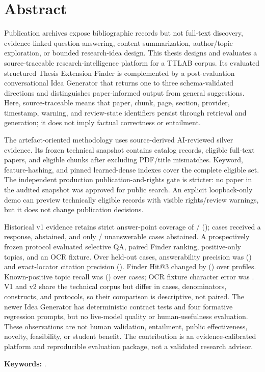 \chapter*{Abstract}

Publication archives expose bibliographic records but not full-text discovery, evidence-linked question answering, content summarization, author/topic exploration, or bounded research-idea design. This thesis designs and evaluates a source-traceable research-intelligence platform for a TTLAB corpus. Its evaluated structured Thesis Extension Finder is complemented by a post-evaluation conversational Idea Generator that returns one to three schema-validated directions and distinguishes paper-informed output from general suggestions. Here, source-traceable means that paper, chunk, page, section, provider, timestamp, warning, and review-state identifiers persist through retrieval and generation; it does not imply factual correctness or entailment.

The artefact-oriented methodology uses source-derived AI-reviewed silver evidence. Its frozen technical snapshot contains \CatalogPaperCount{} catalog records, \EligiblePaperCount{} eligible full-text papers, and \EligibleChunkCount{} eligible chunks after excluding \MismatchPaperCount{} PDF/title mismatches. Keyword, feature-hashing, and pinned learned-dense indexes cover the complete eligible set. The independent production publication-and-rights gate is stricter: no paper in the audited snapshot was approved for public search. An explicit loopback-only demo can preview technically eligible records with visible rights/review warnings, but it does not change publication decisions.

Historical v1 evidence retains strict answer-point coverage of \QaCoveredAnswerPointCount{}/\QaAnswerPointCount{} (\QaAnswerPointCoverage{}); \QaResponseCount{} cases received a response, \QaAbstentionCount{} abstained, and only \QaUnanswerableAbstentionCount{}/\QaUnanswerableCaseCount{} unanswerable cases abstained. A prospectively frozen protocol evaluated selective QA, paired Finder ranking, positive-only topics, and an OCR fixture. Over \VTwoQATestCases{} held-out cases, answerability precision was \VTwoQAAnswerabilityPrecision{} (\VTwoQAAnswerabilityPrecisionCi{}) and exact-locator citation precision \VTwoQACitationLocatorPrecision{} (\VTwoQACitationLocatorPrecisionCi{}). Finder Hit@3 changed by \VTwoFinderHitAtThreeDelta{} (\VTwoFinderHitAtThreeDeltaCi{}) over \VTwoFinderTestProfiles{} profiles. Known-positive topic recall was \VTwoTopicKnownPositiveRecall{} (\VTwoTopicKnownPositiveRecallCi{}) over \VTwoTopicTestCases{} cases; OCR fixture character error was \VTwoOCRCharacterErrorRate{}. V1 and v2 share the technical corpus but differ in cases, denominators, constructs, and protocols, so their comparison is descriptive, not paired. The newer Idea Generator has deterministic contract tests and four formative regression prompts, but no live-model quality or human-usefulness evaluation. These observations are not human validation, entailment, public effectiveness, novelty, feasibility, or student benefit. The contribution is an evidence-calibrated platform and reproducible evaluation package, not a validated research advisor.

\textbf{Keywords:} \thesiskeywords.
